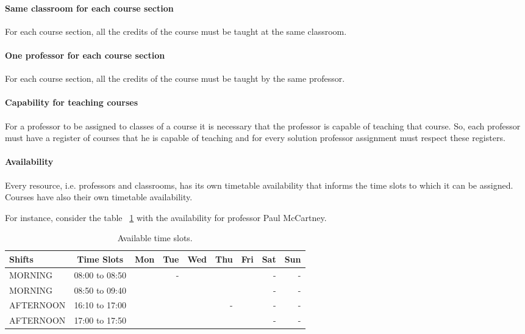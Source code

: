 \paragraph{Same classroom for each course section}
\label{constroneroom}

For each course section, all the credits of the course must be taught at the same classroom.


\paragraph{One professor for each course section}
\label{constroneprof}

For each course section, all the credits of the course must be taught by the same professor.


\paragraph{Capability for teaching courses}
\label{constrcapab}

For a professor to be assigned to classes of a course it is necessary that the professor is capable of teaching that course. So, each professor must have a register of courses that he is capable of teaching and for every solution professor assignment must respect these registers.


\paragraph{Availability}
\label{constravailab}

Every resource, i.e. professors and classrooms, has its own timetable availability that informs the time slots to which it can be assigned. Courses have also their own timetable availability.

For instance, consider the table ~\ref{tab:availabMT} with the availability for professor Paul McCartney.

\begin{table}[H]
\centering
\begin{tabular}{l|c|r|r|r|r|r|r|r}
Shifts & Time Slots & Mon & Tue & Wed & Thu & Fri & Sat & Sun \\\hline
MORNING & 08:00 to 08:50 & & - & & & & - & - \\
MORNING & 08:50 to 09:40 & & & & & & - & - \\
AFTERNOON & 16:10 to 17:00 & & & & - & & - & - \\
AFTERNOON & 17:00 to 17:50 & & & & & & - & -
\end{tabular}
\caption{\label{tab:availabMT}Available time slots.}
\end{table}

